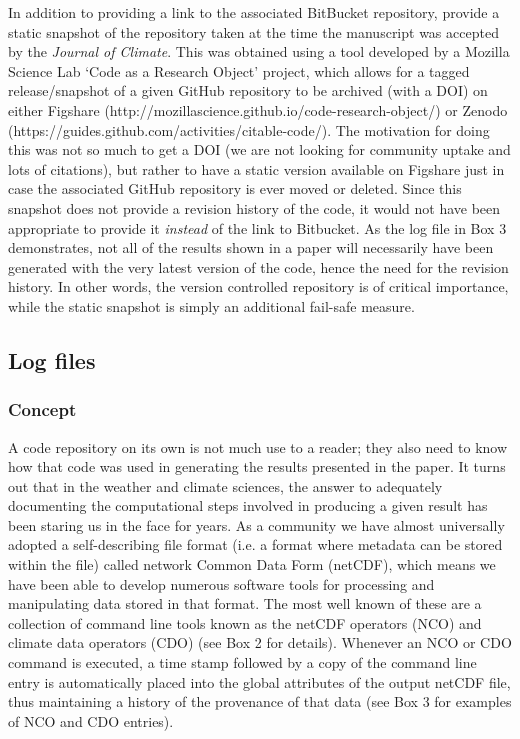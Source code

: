 In addition to providing a link to the associated BitBucket repository, \citet{Irving2015} provide a static snapshot of the repository taken at the time the manuscript was accepted by the \textit{Journal of Climate}. This was obtained using a tool developed by a Mozilla Science Lab `Code as a Research Object' project, which allows for a tagged release/snapshot of a given GitHub repository to be archived (with a DOI) on either Figshare (http://mozillascience.github.io/code-research-object/) or Zenodo (https://guides.github.com/activities/citable-code/). The motivation for doing this was not so much to get a DOI (we are not looking for community uptake and lots of citations), but rather to have a static version available on Figshare just in case the associated GitHub repository is ever moved or deleted. Since this snapshot does not provide a revision history of the code, it would not have been appropriate to provide it \textit{instead} of the link to Bitbucket. As the log file in Box 3 demonstrates, not all of the results shown in a paper will necessarily have been generated with the very latest version of the code, hence the need for the revision history. In other words, the version controlled repository is of critical importance, while the static snapshot is simply an additional fail-safe measure.  

\subsection{Log files}\label{s:log_files}

\subsubsection{Concept}
A code repository on its own is not much use to a reader; they also need to know how that code was used in generating the results presented in the paper. It turns out that in the weather and climate sciences, the answer to adequately documenting the computational steps involved in producing a given result has been staring us in the face for years. As a community we have almost universally adopted a self-describing file format (i.e. a format where metadata can be stored within the file) called network Common Data Form (netCDF), which means we have been able to develop numerous software tools for processing and manipulating data stored in that format. The most well known of these are a collection of command line tools known as the netCDF operators (NCO) and climate data operators (CDO) (see Box 2 for details). Whenever an NCO or CDO command is executed, a time stamp followed by a copy of the command line entry is automatically placed into the global attributes of the output netCDF file, thus maintaining a history of the provenance of that data (see Box 3 for examples of NCO and CDO entries).

